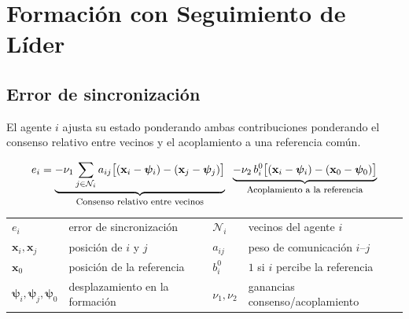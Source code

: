 \section{Formación con Seguimiento de Líder}
\setlength{\columnseprule}{0pt}
\onecolumn
\subsection{Error de sincronización}
El agente $i$ ajusta su estado ponderando ambas contribuciones ponderando el consenso relativo entre vecinos y el acoplamiento a una referencia común.

\begin{equation*}
    e_i =
    \underbrace{-\nu_1 \sum_{j \in \mathcal{N}_i} a_{ij}\big[(\mathbf{x}_i-\boldsymbol{\psi}_i)-(\mathbf{x}_j-\boldsymbol{\psi}_j)\big]}_{\text{\footnotesize Consenso relativo entre vecinos}}
    \;\;
    \underbrace{-\nu_2\, b_i^0\big[(\mathbf{x}_i-\boldsymbol{\psi}_i)-(\mathbf{x}_0-\boldsymbol{\psi}_0)\big]}_{\text{\footnotesize Acoplamiento a la referencia}}
\end{equation*}

{\footnotesize
\noindent
\begin{tabular}{l@{\ }l@{\qquad}l@{\ }l}
$e_i$ & error de sincronización & $\mathcal{N}_i$ & vecinos del agente $i$ \\
$\mathbf{x}_i,\mathbf{x}_j$ & posición de $i$ y $j$ & $a_{ij}$ & peso de comunicación $i$--$j$ \\
$\mathbf{x}_0$ & posición de la referencia & $b_i^0$ & $1$ si $i$ percibe la referencia \\
$\boldsymbol{\psi}_i,\boldsymbol{\psi}_j,\boldsymbol{\psi}_0$ & desplazamiento en la formación & $\nu_1,\nu_2$ & ganancias consenso/acoplamiento \\
\end{tabular}
}
